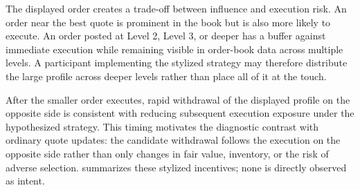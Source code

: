 \documentclass[11pt]{article}
\newenvironment{review}{\begingroup\color{blue}}{\endgroup}
\begin{document}
The displayed order creates a trade-off between influence and execution risk. An order near the best quote is prominent
in the book but is also more likely to execute. An order posted at Level 2, Level 3, or deeper has a buffer against
immediate execution while remaining visible in \begin{review}order-book data across multiple levels\end{review}. A participant implementing the stylized
strategy may therefore distribute the large profile across deeper levels rather than place all of it at the touch.

After the smaller order executes, rapid withdrawal of \begin{review}the displayed profile on the opposite side\end{review} is consistent with reducing
subsequent execution exposure under the hypothesized strategy. This timing motivates the diagnostic contrast with ordinary
quote updates: the candidate withdrawal follows \begin{review}the execution on the opposite side\end{review} rather than only changes in fair value,
inventory, or \begin{review}the risk of adverse selection\end{review}.  summarizes these stylized incentives; none is directly
observed as intent.
\end{document}
